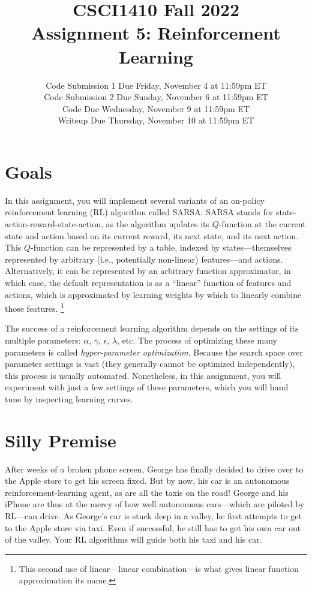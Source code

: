 \documentclass{article}
\title{CSCI1410 Fall 2022 \\
Assignment 5: Reinforcement Learning}
\date{%
Code Submission 1 Due Friday, November 4 at 11:59pm ET\\ [1ex]
Code Submission 2 Due Sunday, November 6 at 11:59pm ET\\ [1ex]
Code Due Wednesday, November 9 at 11:59pm ET\\ [1ex]
Writeup Due Thursday, November 10 at 11:59pm ET\\ [1ex]
}
\begin{document}
\maketitle


\section{Goals}
In this assignment, you will implement several variants of an
on-policy reinforcement learning (RL) algorithm called SARSA.  SARSA
stands for state-action-reward-state-action, as the algorithm updates
its $Q$-function at the current state and action based on its current
reward, its next state, and its next action.  This $Q$-function can be
represented by a table, indexed by states---themselves represented by
arbitrary (i.e., potentially non-linear) features---and actions.
Alternatively, it can be represented by an arbitrary function
approximator, in which case, the default representation is as a
``linear'' function of features and actions, which is approximated by
learning weights by which to linearly combine those features.%
\footnote{This second use of linear---linear combination---is what
  gives linear function approximation its name.}

The success of a reinforcement learning algorithm depends on the
settings of its multiple parameters: $\alpha$, $\gamma$, $\epsilon$,
$\lambda$, etc.  The process of optimizing these many parameters is
called \emph{hyper-parameter optimization}.  Because the search space
over parameter settings is vast (they generally cannot be optimized
independently), this process is usually automated.  Nonetheless, in
this assignment, you will experiment with just a few settings of these
parameters, which you will hand tune by inspecting learning curves.


\section{Silly Premise}
After weeks of a broken phone screen, George has finally decided to
drive over to the Apple store to get his screen fixed.  But by now,
his car is an autonomous reinforcement-learning agent, as are all the
taxis on the road!  George and his iPhone are thus at the mercy of how
well autonomous cars---which are piloted by RL---can drive.  As
George's car is stuck deep in a valley, he first attempts to get to
the Apple store via taxi.  Even if successful, he still has to get his
own car out of the valley.  Your RL algorithms will guide both his
taxi and his car.
\end{document}
